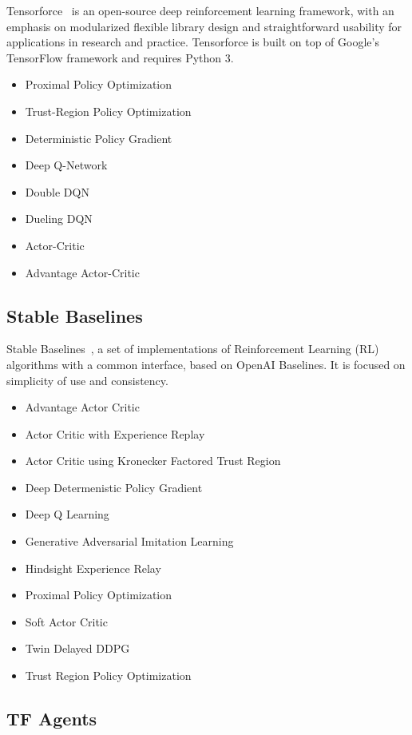 \documentclass[letterpaper, 10 pt]{IEEEconf}
\begin{document}
Tensorforce~\cite{tensorforce} is an open-source deep reinforcement
learning framework, with an emphasis on modularized flexible library
design and straightforward usability for applications in research and
practice. Tensorforce is built on top of Google's TensorFlow framework
and requires Python 3.

\begin{itemize}
	\item Proximal Policy Optimization
	\item Trust-Region Policy Optimization
	\item Deterministic Policy Gradient
	\item Deep Q-Network
	\item Double DQN
	\item Dueling DQN
	\item Actor-Critic
	\item Advantage Actor-Critic
\end{itemize}

\subsection{Stable Baselines}

Stable Baselines~\cite{stable-baselines}, a set of implementations of
Reinforcement Learning (RL) algorithms with a common interface, based
on OpenAI Baselines. It is focused on simplicity of use and
consistency.

\begin{itemize}
	\item Advantage Actor Critic
	\item Actor Critic with Experience Replay
	\item Actor Critic using Kronecker Factored Trust Region
	\item Deep Determenistic Policy Gradient
	\item Deep Q Learning
	\item Generative Adversarial Imitation Learning
	\item Hindsight Experience Relay
	\item Proximal Policy Optimization
	\item Soft Actor Critic
	\item Twin Delayed DDPG
	\item Trust Region Policy Optimization
\end{itemize}

\subsection{TF Agents}
\end{document}
